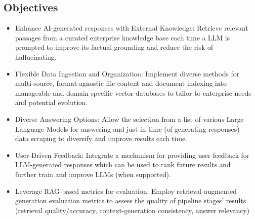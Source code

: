 \subsection{Objectives}
\begin{itemize}
    \item Enhance AI-generated responses with External Knowledge: Retrieve relevant passages from a curated enterprise knowledge base each time a LLM is prompted to improve its factual grounding and reduce the risk of hallucinating.
    \item Flexible Data Ingestion and Organization: Implement diverse methods for multi-source, format-agnostic file content and document indexing into manageable and domain-specific vector databases to tailor to enterprise needs and potential evolution.
    \item Diverse Answering Options: Allow the selection from a list of various Large Language Models for answering and just-in-time (of generating responses) data scraping to diversify and improve results each time.
    \item User-Driven Feedback: Integrate a mechanism for providing user feedback for LLM-generated responses which can be used to rank future results and further train and improve LLMs (when supported).
    \item Leverage RAG-based metrics for evaluation: Employ retrieval-augmented generation evaluation metrics to assess the quality of pipeline stages' results (retrieval quality/accuracy, context-generation consistency, answer relevancy)
\end{itemize}
